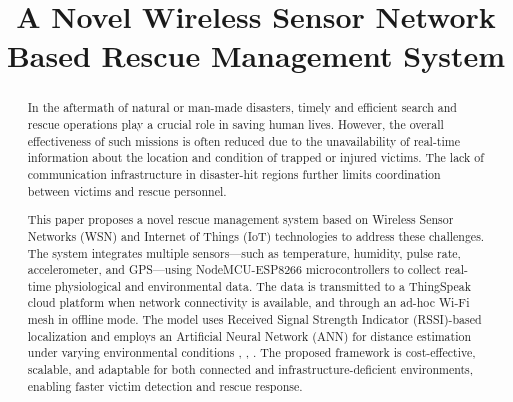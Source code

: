 \documentclass[conference]{IEEEtran}
\begin{document}
\linespread{1.25}

\title{A Novel Wireless Sensor Network Based Rescue Management System}
\\
\\
\\
\\
\author{


\and
{}
\and
{}
}
\\
\\
\\
\maketitle

\begin{abstract}
In the aftermath of natural or man-made disasters, timely and efficient search and rescue operations play a crucial role in saving human lives. However, the overall effectiveness of such missions is often reduced due to the unavailability of real-time information about the location and condition of trapped or injured victims. The lack of communication infrastructure in disaster-hit regions further limits coordination between victims and rescue personnel.

This paper proposes a novel rescue management system based on Wireless Sensor Networks (WSN) and Internet of Things (IoT) technologies to address these challenges. The system integrates multiple sensors—such as temperature, humidity, pulse rate, accelerometer, and GPS—using NodeMCU-ESP8266 microcontrollers to collect real-time physiological and environmental data. The data is transmitted to a ThingSpeak cloud platform when network connectivity is available, and through an ad-hoc Wi-Fi mesh in offline mode. The model uses Received Signal Strength Indicator (RSSI)-based localization and employs an Artificial Neural Network (ANN) for distance estimation under varying environmental conditions \cite{b1}, \cite{b2}, \cite{b6}. The proposed framework is cost-effective, scalable, and adaptable for both connected and infrastructure-deficient environments, enabling faster victim detection and rescue response.
\end{abstract}
\end{document}
